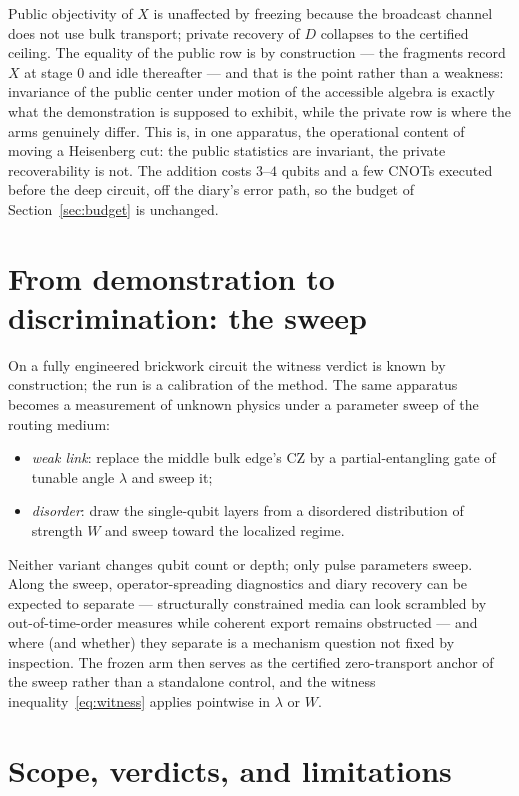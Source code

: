 \documentclass[11pt]{article}
\begin{document}
Public objectivity of $X$ is unaffected by freezing because the
broadcast channel does not use bulk transport; private recovery of
$D$ collapses to the certified ceiling.  The equality of the public
row is by construction --- the fragments record $X$ at stage 0 and
idle thereafter --- and that is the point rather than a weakness:
invariance of the public center under motion of the accessible
algebra is exactly what the demonstration is supposed to exhibit,
while the private row is where the arms genuinely differ.  This is,
in one apparatus, the operational content of moving a Heisenberg
cut: the public statistics are invariant, the private recoverability
is not.  The
addition costs $3$--$4$ qubits and a few CNOTs executed before the
deep circuit, off the diary's error path, so the budget of
Section~\ref{sec:budget} is unchanged.

\section{From demonstration to discrimination: the sweep}
\label{sec:sweep}

On a fully engineered brickwork circuit the witness verdict is known
by construction; the run is a calibration of the method.  The same
apparatus becomes a measurement of unknown physics under a parameter
sweep of the routing medium:
\begin{itemize}
\item \emph{weak link}: replace the middle bulk edge's CZ by a
  partial-entangling gate of tunable angle $\lambda$ and sweep it;
\item \emph{disorder}: draw the single-qubit layers from a disordered
  distribution of strength $W$ and sweep toward the localized
  regime.
\end{itemize}
Neither variant changes qubit count or depth; only pulse parameters
sweep.  Along the sweep, operator-spreading diagnostics and diary
recovery can be expected to separate --- structurally constrained
media can look scrambled by out-of-time-order measures while
coherent export remains obstructed --- and where (and whether) they
separate is a mechanism question not fixed by inspection.  The frozen arm then serves as the
certified zero-transport anchor of the sweep rather than a
standalone control, and the witness
inequality~\eqref{eq:witness} applies pointwise in
$\lambda$ or $W$.

\section{Scope, verdicts, and limitations}
\label{sec:discussion}
\end{document}

